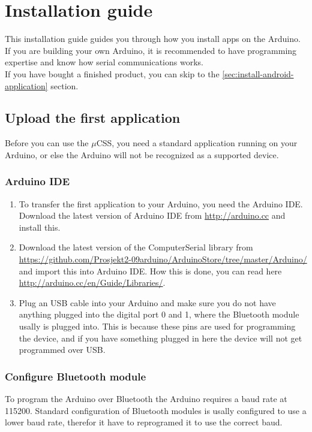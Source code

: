 \chapter{Installation guide}
This installation guide guides you through how you install apps on the Arduino. If you are building your own Arduino, it is recommended to have programming expertise and know how serial communications works.\\

If you have bought a finished product, you can skip to the \ref{sec:install-android-application} section.

	\section{Upload the first application}
	Before you can use the $\mu$CSS, you need a standard application running on your Arduino, or else the Arduino will not be recognized as a supported device.
	
		\subsection{Arduino IDE}
		\begin{enumerate}
		\item To transfer the first application to your Arduino, you need the Arduino IDE. Download the latest version of Arduino IDE from \url{http://arduino.cc} and install this.
	
		\item Download the latest version of the ComputerSerial library from \url{https://github.com/Prosjekt2-09arduino/ArduinoStore/tree/master/Arduino/} and import this into Arduino IDE. How this is done, you can read here \url{http://arduino.cc/en/Guide/Libraries/}.
	
		\item Plug an USB cable into your Arduino and make sure you do not have anything plugged into the digital port 0 and 1, where the Bluetooth module usally is plugged into. This is because these pins are used for programming the device, and if you have something plugged in here the device will not get programmed over USB.
		\end{enumerate}
		
				
		\subsection{Configure Bluetooth module}
		To program the Arduino over Bluetooth the Arduino requires a baud rate at 115200. Standard configuration of Bluetooth modules is usally configured to use a lower baud rate, therefor it have to reprogramed it to use the correct baud.\\
		
